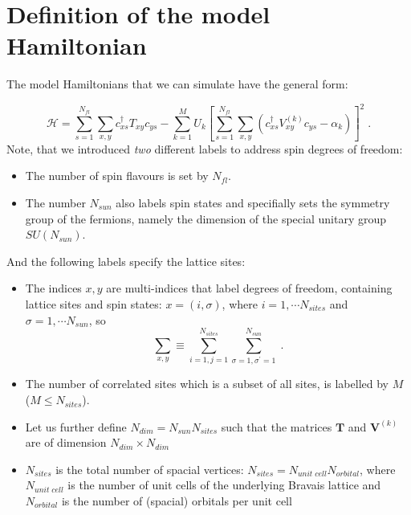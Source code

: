 

\section{Definition of the model Hamiltonian}

The model Hamiltonians that we can simulate have the general form:

\begin{equation}
\label{eqn_general_ham2}
\mathcal{H}
=\sum\limits_{s=1}^{N_{fl}}\sum\limits_{x,y}
c^{\dagger}_{xs}T_{xy}c^{\phantom\dagger}_{ys}
-\sum\limits_{k=1}^{M}U_{k}\left[
\sum\limits_{s=1}^{N_{fl}}\sum\limits_{x,y}
\left( 
c^{\dagger}_{xs}V^{(k)}_{xy}c^{\phantom\dagger}_{y s}-\alpha_{k}
\right)
\right]^{2}\;.
\end{equation}
Note, that  we introduced \textit{two} different labels to address spin degrees of freedom:
\begin{itemize}
\item The number of spin flavours is set by $N_{fl}$. 
\item The number $N_{sun}$ also labels spin states and specifially sets the symmetry group of the fermions, namely 
the dimension of the special unitary group $SU(N_{sun})$.
\end{itemize}
And the following labels specify the lattice sites:
\begin{itemize}
\item 
The indices $x,y$ are multi-indices that label degrees of freedom, containing lattice sites and spin states: $x=(i,\sigma)$, 
where $i=1,\cdots N_{sites}$ and $\sigma=1,\cdots N_{sun}$, so
\begin{equation}
\sum\limits_{x,y}\equiv
\sum\limits_{i=1,j=1}^{N_{sites}}\sum\limits_{\sigma=1,\sigma^{\prime}=1}^{N_{sun}}\;.
\end{equation}

\item The number of correlated sites which is a subset of all sites, is labelled by $M$  ($M\leq N_{sites}$).

\item Let us further define  $N_{dim}=N_{sun} N_{sites}$ such that the matrices $\bm{T}$ and $\bm{V}^{(k)}$ are  of dimension $N_{dim}\times N_{dim}$ 

\item $N_{sites}$ is the total number of spacial vertices: $N_{sites}=N_{unit\;cell} N_{orbital}$, where $N_{unit\;cell}$ is the number of unit cells of the underlying Bravais lattice and
$N_{orbital}$ is the number of (spacial) orbitals per unit cell 

\end{itemize}


